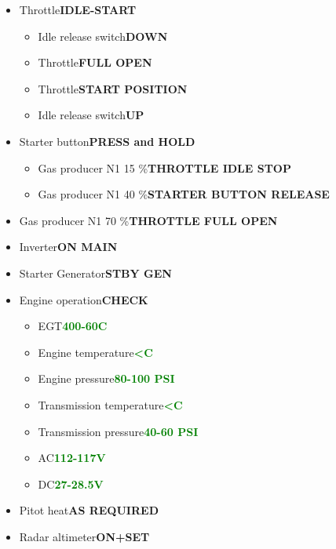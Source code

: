 \documentclass[a4paper,12pt,dvipsnames]{letter}
\newcommand{\button}[1]{\textbf{#1}}
\newcommand{\degC}{\textdegree{}C}
\newcommand{\ok}[1]{\textcolor{Green}{\textbf{#1}}}
\begin{document}
{\begin{itemize}
 \item Throttle\dotfill\button{IDLE-START}
 \begin{itemize}
  \item Idle release switch\dotfill\button{DOWN}
  \item Throttle\dotfill\button{FULL OPEN}
  \item Throttle\dotfill\button{START POSITION}
  \item Idle release switch\dotfill\button{UP}
 \end{itemize}
 \item Starter button\dotfill\button{PRESS and HOLD}
 \begin{itemize}
  \item Gas producer N1 15 \%\dotfill\button{THROTTLE IDLE STOP}
  \item Gas producer N1 40 \%\dotfill\button{STARTER BUTTON RELEASE}
 \end{itemize}
 \item Gas producer N1 70 \%\dotfill\button{THROTTLE FULL OPEN}
 \item Inverter\dotfill\button{ON MAIN}
 \item Starter Generator\dotfill\button{STBY GEN}
 \item Engine operation\dotfill\button{CHECK}
 \begin{itemize}
  \item EGT\dotfill\ok{400-60\;\degC}
  \item Engine temperature\dotfill\ok{<\;\degC}
  \item Engine pressure\dotfill\ok{80-100 PSI}
  \item Transmission temperature\dotfill\ok{<\;\degC}
  \item Transmission pressure\dotfill\ok{40-60 PSI}
  \item AC\dotfill\ok{112-117\;V}
  \item DC\dotfill\ok{27-28.5\;V}
 \end{itemize}
 \item Pitot heat\dotfill\button{AS REQUIRED}
 \item Radar altimeter\dotfill\button{ON+SET}
\end{itemize}
}
%
\end{document}
